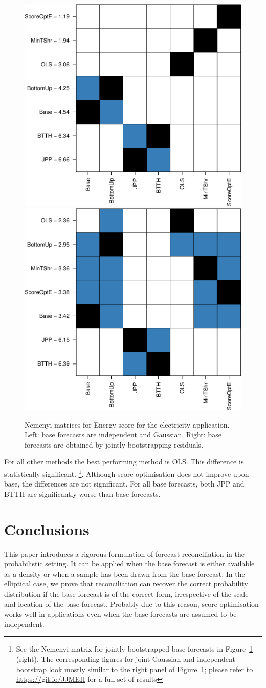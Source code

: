 \documentclass[a4paper,12pt]{article}
\theoremstyle{definition}
\begin{document}
\begin{figure}[!htb]
  \centerline{\includegraphics[width=.4\textwidth]{Figs/nemenyi_ig.pdf}\includegraphics[width=.4\textwidth]{Figs/nemenyi_jb.pdf}}
  \caption{Nemenyi matrices for Energy score for the electricity application. Left: base forecasts are independent and Gaussian. Right: base forecasts are obtained by jointly bootstrapping residuals.}\label{fig:nem_app}
\end{figure}


For all other methods the best performing method is OLS. This difference is statistically significant. \footnote{See the Nemenyi matrix for jointly bootstrapped base forecasts in Figure~\ref{fig:nem_app} (right). The corresponding figures for joint Gaussian and independent bootstrap look mostly similar to the right panel of Figure~\ref{fig:nem_app}; please refer to \url{https://git.io/JJMEH} for a full set of results}. Although score optimisation does not improve upon base, the differences are not significant. For all base forecasts, both JPP and BTTH are significantly worse than base forecasts.


\section{Conclusions}\label{sec:conclusion}

This paper introduces a rigorous formulation of forecast reconciliation in the probabilistic setting. It can be applied when the base forecast is either available as a density or when a sample has been drawn from the base forecast. In the elliptical case, we prove that reconciliation can recover the correct probability distribution if the base forecast is of the correct form, irrespective of the scale and location of the base forecast. Probably due to this reason, score optimisation works well in applications even when the base forecasts are assumed to be independent.
\end{document}
